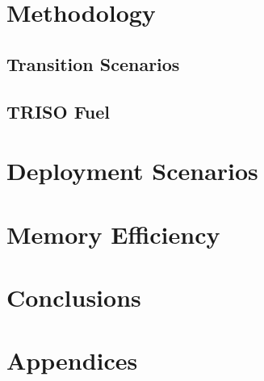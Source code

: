 \documentclass[edeposit,fullpage]{uiucthesis2018}
\begin{document}






\chapter{Methodology}
\label{ch:methodology}
\section{Transition Scenarios}


\section{TRISO Fuel}









\chapter{Deployment Scenarios}
\label{ch:scenarios}



\chapter{Memory Efficiency}
\label{ch:memory}

\chapter{Conclusions}
\label{ch:conclusions}






\chapter{Appendices}


\backmatter



\end{document}
